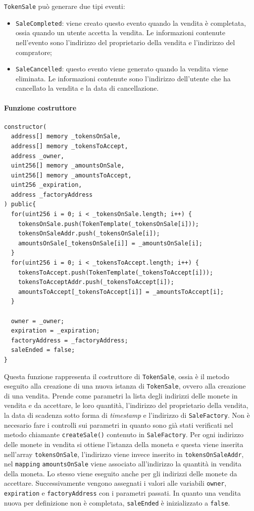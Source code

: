 \documentclass[a4paper]{article}
\begin{document}
        \verb|TokenSale| può generare due tipi eventi:
        \begin{itemize}
          \item \verb|SaleCompleted|: viene creato questo evento quando la vendita è completata, ossia quando un utente accetta la vendita. Le informazioni contenute nell'evento sono l'indirizzo del proprietario della vendita e l'indirizzo del compratore;
          \item \verb|SaleCancelled|: questo evento viene generato quando la vendita viene eliminata. Le informazioni contenute sono l'indirizzo dell'utente che ha cancellato la vendita e la data di cancellazione.
        \end{itemize}
        \paragraph{Funzione costruttore}
\begin{lstlisting}[style=ES6, title={Funzione cancelBatchSales()}]
constructor(
  address[] memory _tokensOnSale,
  address[] memory _tokensToAccept,
  address _owner,
  uint256[] memory _amountsOnSale,
  uint256[] memory _amountsToAccept,
  uint256 _expiration,
  address _factoryAddress
) public{
  for(uint256 i = 0; i < _tokensOnSale.length; i++) {
    tokensOnSale.push(TokenTemplate(_tokensOnSale[i]));
    tokensOnSaleAddr.push(_tokensOnSale[i]);
    amountsOnSale[_tokensOnSale[i]] = _amountsOnSale[i];
  }
  for(uint256 i = 0; i < _tokensToAccept.length; i++) {
    tokensToAccept.push(TokenTemplate(_tokensToAccept[i]));
    tokensToAcceptAddr.push(_tokensToAccept[i]);
    amountsToAccept[_tokensToAccept[i]] = _amountsToAccept[i];
  }

  owner = _owner;
  expiration = _expiration;
  factoryAddress = _factoryAddress;
  saleEnded = false;
}\end{lstlisting}
        Questa funzione rappresenta il costruttore di \verb|TokenSale|, ossia è il metodo eseguito alla creazione di una nuova istanza di \verb|TokenSale|, ovvero alla creazione di una vendita.
        Prende come parametri la lista degli indirizzi delle monete in vendita e da accettare, le loro quantità, l'indirizzo del proprietario della vendita, la data di scadenza sotto forma di \emph{timestamp}
        e l'indirizzo di \verb|SaleFactory|. Non è necesario fare i controlli sui parametri in quanto sono già stati verificati nel metodo chiamante \verb|createSale()| contenuto in \verb|SaleFactory|.
        Per ogni indirizzo delle monete in vendita si ottiene l'istanza della moneta e questa viene inserita nell'array \verb|tokensOnSale|, l'indirizzo viene invece inserito in \verb|tokensOnSaleAddr|, nel \verb|mapping| \verb|amountsOnSale|
        viene associato all'indirizzo la quantità in vendita della moneta. Lo stesso viene eseguito anche per gli indirizzi delle monete da accettare. Successivamente vengono assegnati i valori alle variabili \verb|owner|, \verb|expiration| e \verb|factoryAddress| con i parametri passati.
        In quanto una vendita nuova per definizione non è completata, \verb|saleEnded| è inizializzato a \verb|false|.
\end{document}
